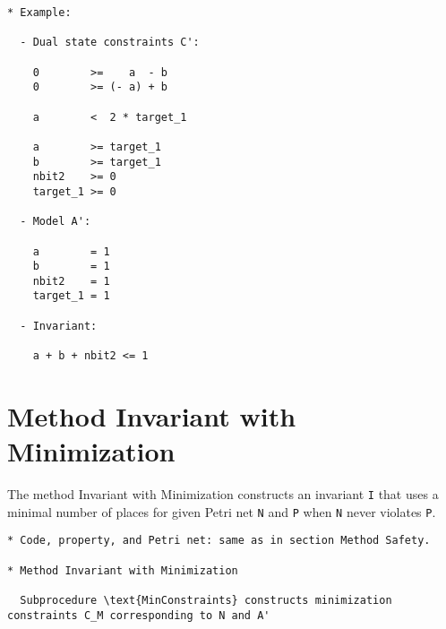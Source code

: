 \documentclass{llncs}
\begin{document}
\newpage

\begin{verbatim}
* Example:

  - Dual state constraints C':

    0        >=    a  - b
    0        >= (- a) + b

    a        <  2 * target_1

    a        >= target_1
    b        >= target_1
    nbit2    >= 0
    target_1 >= 0

  - Model A':

    a        = 1
    b        = 1
    nbit2    = 1
    target_1 = 1
    
  - Invariant:

    a + b + nbit2 <= 1

\end{verbatim}

\newpage

\section{Method Invariant with Minimization}

The method Invariant with Minimization constructs an invariant \verb=I=
that uses a minimal number of places for given Petri net \verb=N= and
\verb=P= when \verb=N= never violates \verb=P=. 

\begin{verbatim}
* Code, property, and Petri net: same as in section Method Safety.

* Method Invariant with Minimization

  Subprocedure \text{MinConstraints} constructs minimization constraints C_M corresponding to N and A'
\end{verbatim}
\end{document}
